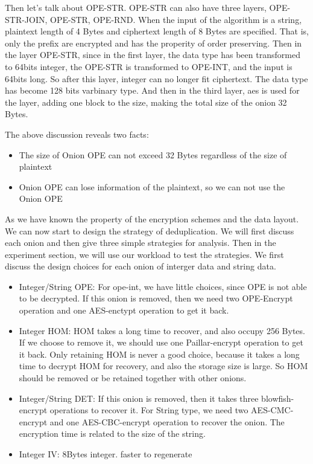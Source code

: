 Then let's talk about OPE-STR. OPE-STR can also have three layers, OPE-STR-JOIN, OPE-STR, OPE-RND. When the input of the algorithm is a string, plaintext length of 4 Bytes and  ciphertext length of 8 Bytes are specified. That is, only the prefix are encrypted and has the properity of order preserving. Then in the layer OPE-STR, since in the first layer, the data type has been transformed to 64bits integer, the OPE-STR is transformed to OPE-INT, and the input is 64bits long. So after this layer, integer can no longer fit ciphertext. The data type has become 128 bits varbinary type. And then in the third layer, aes is used for the layer, adding one block to the size, making the total size of the onion 32 Bytes.


The above discussion reveals two facts:

\begin{itemize}
\item The size of Onion OPE can not exceed 32 Bytes regardless of the size of plaintext
\item Onion OPE can lose information of the plaintext, so we can not use the Onion OPE
\end{itemize}



As we have known the property of the encryption schemes and the data layout. We can now start to design the strategy of deduplication. We will first discuss each onion and then give three simple strategies for analysis. Then in the experiment section, we will use our workload to test the strategies. We first discuss the design choices for each onion of interger data and string data. 


\begin{itemize}
\item Integer/String OPE: For ope-int, we have little choices, since OPE is not able to be decrypted. If this onion is removed, then we need two OPE-Encrypt operation and one AES-enctypt operation to get it back. 
\item Integer HOM: HOM takes a long time to recover, and also occupy 256 Bytes. If we choose to remove it, we should use one Paillar-encrypt operation to get it back. Only retaining HOM is never a good choice, because it takes a long time to decrypt HOM for recovery, and also the storage size is large. So HOM should be removed or be retained together with other onions.
\item Integer/String DET: If this onion is removed, then it takes three blowfish-encrypt operations to recover it. For String type, we need two AES-CMC-encrypt and one AES-CBC-encrypt operation to recover the onion. The encryption time is related to the size of the string.
\item Integer IV: 8Bytes integer. faster to regenerate
\end{itemize}



